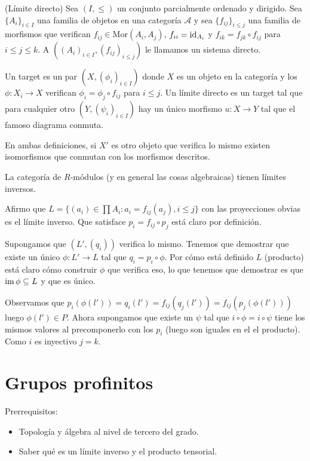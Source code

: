 \documentclass[a4paper,12pt, leqno]{report}
\begin{document}
\begin{definicion} (Límite directo)
	Sea $(I,\leq)$ un conjunto parcialmente ordenado y dirigido. Sea $\{A_i\}_{i \in I}$ una familia de objetos en una categoría $\mathcal{A}$ y sea $\{f_{ij}\}_{i\leq j}$ una familia de morfismos que verifican $f_{ij}\in \mathrm{Mor}(A_i,A_j)$, $f_{ii}=\mathrm{id}_{A_i}$ y $f_{ik}=f_{jk}\circ f_{ij}$ para $i\leq j \leq k$. A $((A_i)_{i \in I}, (f_{ij})_{i\leq j})$ le llamamos un sistema directo.
	
	Un target es un par $(X,(\phi_i)_{i\in I})$ donde $X$ es un objeto en la categoría y los $\phi: X_i \rightarrow X$ verifican $\phi_i = \phi_j \circ f_{ij}$ para $i \leq j$. Un límite directo es un target tal que para cualquier otro $(Y,(\psi_i)_{i\in I})$ hay un único morfismo $u:X \rightarrow Y$ tal que el famoso diagrama conmuta. 
	

\end{definicion}
En ambas definiciones, si $X'$ es otro objeto que verifica lo mismo existen isomorfismos que conmutan con los morfismos descritos. 
\begin{prop}
La categoría de $R$-módulos (y en general las cosas algebraicas) tienen límites inversos. 
\end{prop}
\begin{dem}
	Afirmo que $L=\{(a_i) \in \prod A_i:a_i=f_{ij}(a_j),i\leq j\}$ con las proyecciones obvias es el límite inverso. Que satisface $p_i=f_{ij}\circ p_j$ está claro por definición. 
	
	Supongamos que $(L',(q_i))$ verifica lo mismo. Tenemos que demostrar que existe un único $\phi: L' \rightarrow L$ tal que $q_i=p_i \circ \phi$. Por cómo está definido $L$ (producto) está claro cómo construir $\phi$ que verifica eso, lo que tenemos que demostrar es que $\mathrm{im}\, \phi \subseteq L$ y que es único. 
	
	Observamos que $p_i(\phi(l'))=q_i(l')=f_{ij}(q_j(l'))=f_{ij}(p_j(\phi(l')))$ luego $\phi(l')\in P$. Ahora supongamos que existe un $\psi$ tal que  $i \circ \phi = i \circ \psi$ tiene los mismos valores al precomponerlo con los $p_i$ (luego son  iguales en el el producto). Como $i$ es inyectivo $j=k$.
\end{dem}
\section*{Grupos profinitos}

Prerrequisitos:

\begin{itemize}
	\item Topología y álgebra al nivel de tercero del grado.
	\item Saber qué es un límite inverso y el producto tensorial.
\end{itemize}
\end{document}
